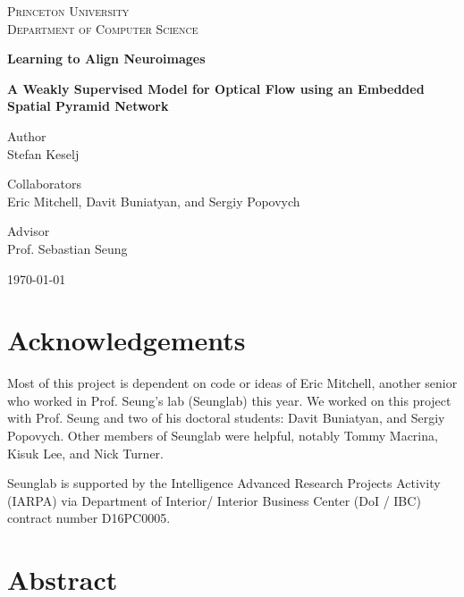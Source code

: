 \documentclass[12pt,a4paper]{article}
\begin{document}
\begin{titlepage}
	\centering
	{\scshape \Large Princeton University \\}
	{\scshape \large Department of Computer Science}
	
	\vspace{3.0cm}
	{\LARGE \bfseries Learning to Align Neuroimages}
    
    {\large \bfseries A Weakly Supervised Model for Optical Flow using an Embedded Spatial Pyramid Network}

	\vspace{2.0cm}
	{Author \\}
	{\large Stefan Keselj}

	\vspace{0.5cm}
	{Collaborators \\}
	{\large Eric Mitchell, Davit Buniatyan, and Sergiy Popovych}

	\vspace{0.5cm}
	{Advisor \\}
	{ \large Prof. Sebastian Seung}
	\vfill

	{\large \today\par}
\end{titlepage}



\section*{Acknowledgements}

Most of this project is dependent on code or ideas of Eric Mitchell, another senior who worked in Prof. Seung's lab (Seunglab) this year. We worked on this project with Prof. Seung and two of his doctoral students: Davit Buniatyan, and Sergiy Popovych. Other members of Seunglab were helpful, notably Tommy Macrina, Kisuk Lee, and Nick Turner. 

Seunglab is supported by the Intelligence Advanced
Research Projects Activity (IARPA) via Department of Interior/ Interior Business Center (DoI / IBC) contract number D16PC0005. 

\thispagestyle{empty}	%
\clearpage
{} 

\newpage



\section*{Abstract}
\end{document}
